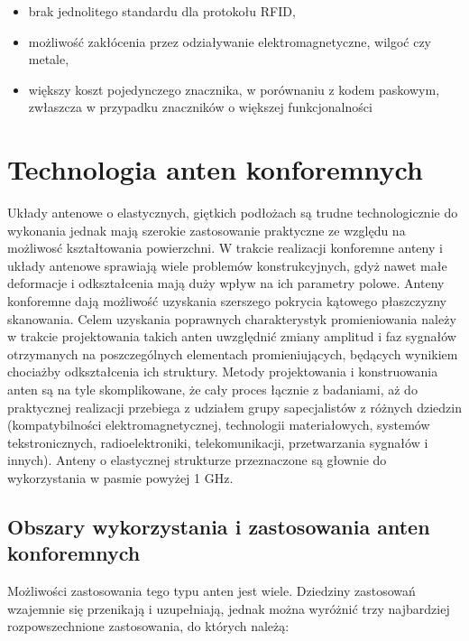 \begin{itemize}\setlength{\itemsep}{0pt}

	\item brak jednolitego standardu dla protokołu RFID,
	
	\item możliwość zakłócenia przez odziaływanie elektromagnetyczne, wilgoć czy metale,
 	
 	\item większy koszt pojedynczego znacznika, w porównaniu z kodem paskowym, zwłaszcza w przypadku znaczników o większej funkcjonalności 

\end{itemize}





\chapter{Technologia anten konforemnych}

Układy antenowe o elastycznych, giętkich podłożach są trudne technologicznie do wykonania jednak mają szerokie zastosowanie praktyczne ze względu na możliwosć kształtowania powierzchni. 
W trakcie realizacji konforemne anteny i układy antenowe sprawiają wiele problemów konstrukcyjnych, gdyż nawet małe deformacje i odkształcenia mają duży wpływ na ich parametry polowe. 
Anteny konforemne dają możliwość uzyskania szerszego pokrycia kątowego płaszczyzny skanowania. Celem uzyskania poprawnych charakterystyk promieniowania należy w trakcie projektowania takich anten uwzględnić zmiany amplitud i faz sygnałów otrzymanych na poszczególnych elementach promieniujących, będących wynikiem chociażby odkształcenia ich struktury.    
Metody projektowania i konstruowania anten są na tyle skomplikowane, że cały proces łącznie z badaniami, aż do praktycznej realizacji przebiega z udziałem grupy sapecjalistów z różnych dziedzin (kompatybilności elektromagnetycznej, technologii materiałowych, systemów tekstronicznych, radioelektroniki, telekomunikacji, przetwarzania sygnałów i innych). Anteny o elastycznej strukturze przeznaczone są głownie do wykorzystania w pasmie powyżej 1 GHz.     

\section{Obszary wykorzystania i zastosowania anten konforemnych}

Możliwości zastosowania tego typu anten jest wiele. Dziedziny zastosowań wzajemnie się przenikają i uzupełniają, jednak można wyróżnić trzy najbardziej rozpowszechnione zastosowania, do których należą:

